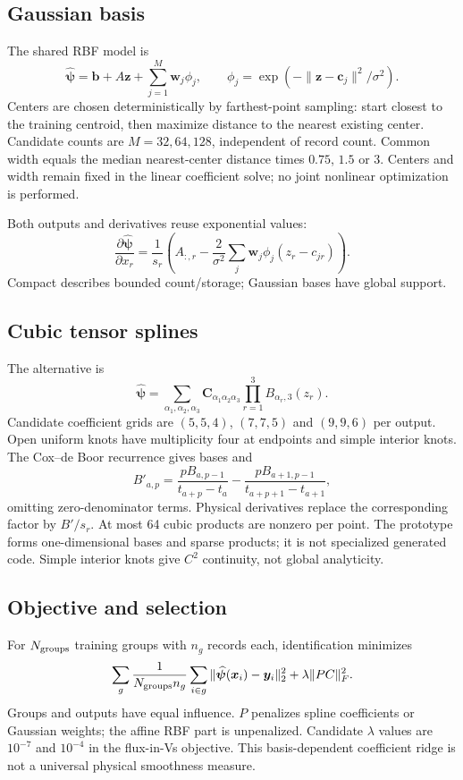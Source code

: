\documentclass[11pt,a4paper]{article}
\begin{document}
\subsection{Gaussian basis}
The shared RBF model is
\begin{equation}
 \widehat{\bm\psi}=\bm b+A\bm z+\sum_{j=1}^M\bm w_j\phi_j,\qquad
 \phi_j=\exp(-\|\bm z-\bm c_j\|^2/\sigma^2).
\end{equation}
Centers are chosen deterministically by farthest-point sampling: start closest to the training centroid, then maximize distance to the nearest existing center. Candidate counts are $M=32,64,128$, independent of record count. Common width equals the median nearest-center distance times $0.75$, $1.5$ or $3$. Centers and width remain fixed in the linear coefficient solve; no joint nonlinear optimization is performed.

Both outputs and derivatives reuse exponential values:
\begin{equation}
 \frac{\partial\widehat{\bm\psi}}{\partial x_r}
 =\frac{1}{s_r}\left(A_{:,r}
 -\frac{2}{\sigma^2}\sum_j\bm w_j\phi_j(z_r-c_{jr})\right).
\end{equation}
Compact describes bounded count/storage; Gaussian bases have global support.

\subsection{Cubic tensor splines}
The alternative is
\begin{equation}
 \widehat{\bm\psi}=
 \sum_{\alpha_1,\alpha_2,\alpha_3}\bm C_{\alpha_1\alpha_2\alpha_3}
 \prod_{r=1}^3B_{\alpha_r,3}(z_r).
\end{equation}
Candidate coefficient grids are $(5,5,4)$, $(7,7,5)$ and $(9,9,6)$ per output. Open uniform knots have multiplicity four at endpoints and simple interior knots. The Cox--de Boor recurrence gives bases and
\begin{equation}
 B'_{a,p}=\frac{pB_{a,p-1}}{t_{a+p}-t_a}
 -\frac{pB_{a+1,p-1}}{t_{a+p+1}-t_{a+1}},
\end{equation}
omitting zero-denominator terms. Physical derivatives replace the corresponding factor by $B'/s_r$. At most 64 cubic products are nonzero per point. The prototype forms one-dimensional bases and sparse products; it is not specialized generated code. Simple interior knots give $C^2$ continuity, not global analyticity.

\subsection{Objective and selection}
For $N_{\rm groups}$ training groups with $n_g$ records each, identification minimizes
\begin{equation}
 \sum_g\frac{1}{N_{\rm groups}n_g}
 \sum_{i\in g}\|\widehat{\bm\psi}(\bm x_i)-\bm y_i\|_2^2
 +\lambda\|PC\|_F^2.
\end{equation}
Groups and outputs have equal influence. $P$ penalizes spline coefficients or Gaussian weights; the affine RBF part is unpenalized. Candidate $\lambda$ values are $10^{-7}$ and $10^{-4}$ in the flux-in-Vs objective. This basis-dependent coefficient ridge is not a universal physical smoothness measure.
\end{document}
